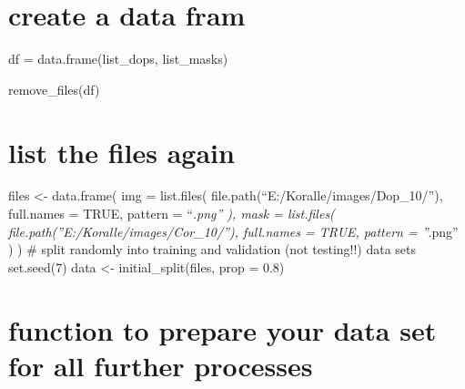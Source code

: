\documentclass[
]{article}
\begin{document}
{{{{{\section{create a data fram}\label{create-a-data-fram}}

df = data.frame(list\_dops, list\_masks)

remove\_files(df)

\hypertarget{list-the-files-again}{%
\section{list the files again}\label{list-the-files-again}}

files \textless- data.frame( img = list.files(
file.path(``E:/Koralle/images/Dop\_10/''), full.names = TRUE, pattern =
``\emph{.png'' ), mask = list.files(
file.path(''E:/Koralle/images/Cor\_10/''), full.names = TRUE, pattern =
''}.png'' ) ) \# split randomly into training and validation (not
testing!!) data sets set.seed(7) data \textless- initial\_split(files,
prop = 0.8)

\hypertarget{function-to-prepare-your-data-set-for-all-further-processes}{%
\section{function to prepare your data set for all further
processes}\label{function-to-prepare-your-data-set-for-all-further-processes}}

}}}}
\end{document}
